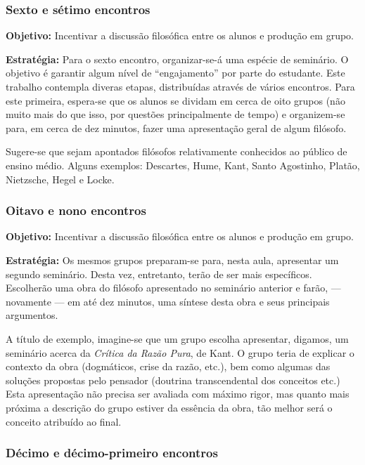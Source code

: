 \documentclass[12pt,a4paper]{article}
\newenvironment{citac}{
	\begin{addmargin}[4cm]{1em} \footnotesize}{\normalfont \end{addmargin}
}
\begin{document}
\begin{citac}
	\subsubsection{Sexto e sétimo encontros}
	
	\textbf{Objetivo:} Incentivar a discussão filosófica entre 
	os alunos e produção em grupo. 

	\textbf{Estratégia:}
	Para o sexto encontro, organizar-se-á uma espécie de seminário. 
	O objetivo é garantir algum nível de ``engajamento'' por parte 
	do estudante. Este trabalho contempla diveras etapas, distribuídas 
	através de vários encontros. Para este primeira, espera-se que 
	os alunos se dividam em cerca de oito grupos (não muito mais do que 
	isso, por questões principalmente de tempo) e organizem-se para, 
	em cerca de dez minutos, fazer uma apresentação geral de algum
	filósofo. 
	
	Sugere-se que sejam apontados filósofos relativamente conhecidos 
	ao público de ensino médio. Alguns exemplos: Descartes, Hume, 
	Kant, Santo Agostinho, Platão, Nietzsche, Hegel e Locke. 
	
	\subsubsection{Oitavo e nono encontros}
	
	\textbf{Objetivo:} Incentivar a discussão filosófica entre 
	os alunos e produção em grupo. 

	\textbf{Estratégia:}
	Os mesmos grupos preparam-se para, nesta aula, apresentar um 
	segundo seminário. Desta vez, entretanto, terão de ser mais 
	específicos. Escolherão uma obra do filósofo apresentado no 
	seminário anterior e farão, --- novamente --- em até dez minutos, 
	uma síntese desta obra e seus principais argumentos. 
	
	A título de exemplo, imagine-se que um grupo escolha apresentar, 
	digamos, um seminário acerca da \textit{Crítica da Razão Pura}, 
	de Kant. O grupo teria de explicar o contexto da obra (dogmáticos, 
	crise da razão, etc.), bem como algumas das soluções propostas 
	pelo pensador (doutrina transcendental dos conceitos etc.) Esta 
	apresentação não precisa ser avaliada com máximo rigor, mas quanto 
	mais próxima a descrição do grupo estiver da essência da obra, 
	tão melhor será o conceito atribuído ao final. 
	
	\subsubsection{Décimo e décimo-primeiro encontros}
	

\end{citac}
\end{document}
